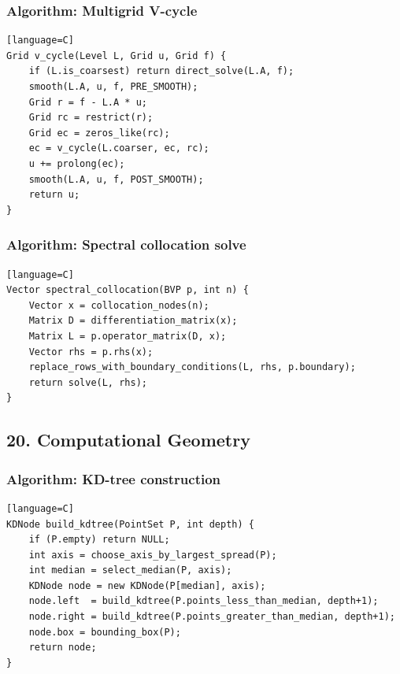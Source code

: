 \documentclass[11pt]{article}
\begin{document}
\subsubsection{Algorithm: Multigrid V-cycle}\label{algorithm-multigrid-v-cycle}

\begin{verbatim}[language=C]
Grid v_cycle(Level L, Grid u, Grid f) {
    if (L.is_coarsest) return direct_solve(L.A, f);
    smooth(L.A, u, f, PRE_SMOOTH);
    Grid r = f - L.A * u;
    Grid rc = restrict(r);
    Grid ec = zeros_like(rc);
    ec = v_cycle(L.coarser, ec, rc);
    u += prolong(ec);
    smooth(L.A, u, f, POST_SMOOTH);
    return u;
}
\end{verbatim}

\subsubsection{Algorithm: Spectral collocation solve}\label{algorithm-spectral-collocation-solve}

\begin{verbatim}[language=C]
Vector spectral_collocation(BVP p, int n) {
    Vector x = collocation_nodes(n);
    Matrix D = differentiation_matrix(x);
    Matrix L = p.operator_matrix(D, x);
    Vector rhs = p.rhs(x);
    replace_rows_with_boundary_conditions(L, rhs, p.boundary);
    return solve(L, rhs);
}
\end{verbatim}

\subsection{20. Computational Geometry}\label{computational-geometry}

\subsubsection{Algorithm: KD-tree construction}\label{algorithm-kd-tree-construction}

\begin{verbatim}[language=C]
KDNode build_kdtree(PointSet P, int depth) {
    if (P.empty) return NULL;
    int axis = choose_axis_by_largest_spread(P);
    int median = select_median(P, axis);
    KDNode node = new KDNode(P[median], axis);
    node.left  = build_kdtree(P.points_less_than_median, depth+1);
    node.right = build_kdtree(P.points_greater_than_median, depth+1);
    node.box = bounding_box(P);
    return node;
}
\end{verbatim}
\end{document}
